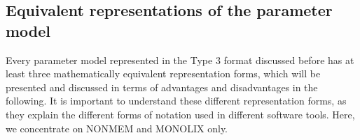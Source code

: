 

\subsection{Equivalent representations of the parameter model}
Every parameter model represented in the Type 3 format discussed before has at least three mathematically equivalent representation forms,
which will be presented and discussed in terms of advantages and disadvantages in the following. It is important to understand these different
representation forms, as they explain the different forms of notation used in different software tools. Here, we concentrate on NONMEM and MONOLIX only.



